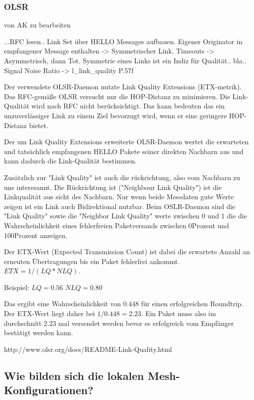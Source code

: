 \documentclass[a4paper,10pt]{article}
\begin{document}

\subsubsection*{OLSR}

von AK zu bearbeiten

...RFC lesen..
Link Set über HELLO Messages aufbauen. Eigener Originator in 
empfangener Message enthalten -> Symmetrischer Link. Timeouts -> Asymmetrisch, dann Tot.
Symmetrie eines Links ist ein Indiz für Qualität.. bla..
Signal Noise Ratio -> l\_link\_quality P.57f

Der verwendete OLSR-Daemon nutzte Link Quality Extensions (ETX-metrik).
Das RFC-gemäße OLSR versucht nur die HOP-Distanz zu minimieren. Die Link-Qualität
wird nach RFC nicht berücksichtigt. Das kann bedeuten das ein unzuverlässiger Link zu einem Ziel bevorzugt wird,
wenn er eine geringere HOP-Distanz bietet.

Der um Link Quality Extensions erweiterte OLSR-Daemon wertet die erwarteten und tatsächlich empfangenen
HELLO Pakete seiner direkten Nachbarn aus und kann dadurch die Link-Qualität bestimmen.

Zusätzlich zur "Link Quality" ist auch die rückrichtung, also vom Nachbarn zu uns interesannt.
Die Rückrichtung ist ("Neighbour Link Quality") ist die Linkqualität aus sicht des Nachbarn.
Nur wenn beide Messdaten gute Werte zeigen ist ein Link auch Bidirektional nutzbar.
Beim OSLR-Daemon sind die "Link Quality" sowie die "Neighbor Link Quality" werte zwischen
0 und 1 die die Wahrscheinlichkeit eines fehlerfreien Paketversands zwischen 0Prozent und 100Prozent anzeigen.

Der ETX-Wert (Expected Transmission Count) ist dabei die erwartete Anzahl an erneuten Übertragungen bis ein Paket fehlerfrei ankommt.
$ETX= 1/(LQ*NLQ)$.

Beispiel:
$LQ=0.56$
$NLQ=0.80$

Das ergibt eine Wahrscheinlichkeit von $0.448$ für einen erfolgreichen Roundtrip.
Der ETX-Wert liegt daher bei $1/0.448=2.23$. Ein Paket muss also im durchschnitt 2.23 mal versendet werden
bevor es erfolgreich vom Empfänger bestätigt werden kann.



http://www.olsr.org/docs/README-Link-Quality.html

\subsection{Wie bilden sich die lokalen Mesh-Konfigurationen?}
\end{document}
